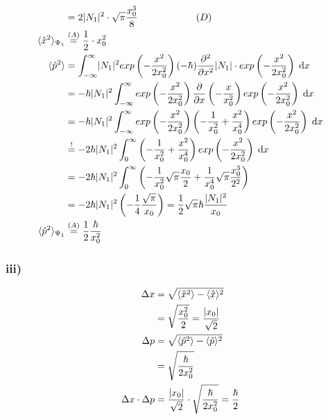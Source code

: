 \begin{align*}
        &= 2 \lvert N_1\rvert^2 \cdot \sqrt{\pi} \frac{x_0^3}{8} \qquad \qquad \qquad (D)\\
        \langle \hat{x}^2 \rangle_{\Psi_1} &\stackrel{(A)}{=} \frac{1}{2} \cdot x_0^2\\
        \langle \hat{p}^2 \rangle &= \int_{-\infty}^{\infty} \lvert N_1\rvert^2 exp \left(- \frac{x^2}{2x_0^2} \right) (-\hbar) \frac{\partial ^2}{\partial x^2} 
        \lvert N_1\rvert \cdot exp \left(- \frac{x^2}{2x_0^2} \right) \; \mathrm{d}x\\
        &= - \hbar \lvert N_1\rvert^2 \int_{-\infty}^{\infty} exp \left(- \frac{x^2}{2x_0^2} \right) \frac{\partial}{\partial x} \left( -\frac{x}{x_0^2} 
        \right) exp \left(- \frac{x^2}{2x_0^2} \right) \; \mathrm{d}x \nonumber\\
        &= - \hbar \lvert N_1\rvert^2 \int_{-\infty}^{\infty} exp \left(- \frac{x^2}{2x_0^2} \right) \left( -\frac{1}{x_0^2} + \frac{x^2}{x_0^4} \right) 
        exp \left(- \frac{x^2}{2x_0^2} \right) \; \mathrm{d}x \nonumber\\
        &\stackrel{!}{=} -2 \hbar \lvert N_1\rvert^2 \int_{0}^{\infty} \left( -\frac{1}{x_0^2} + \frac{x^2}{x_0^4} \right) exp \left(- \frac{x^2}{2x_0^2}
        \right) \; \mathrm{d}x \nonumber\\
        &= -2 \hbar \lvert N_1\rvert^2 \int_{0}^{\infty} \left( -\frac{1}{x_0^2} \sqrt{\pi} \frac{x_0}{2} + \frac{1}{x_0^4} \sqrt{\pi} \frac{x_0^3}{2^2}
        \right) \nonumber\\
        &= -2 \hbar \lvert N_1\rvert^2 \left( -\frac{1}{4} \frac{\sqrt{\pi}}{x_0} \right) = \frac{1}{2} \sqrt{\pi} \hbar \frac{\lvert N_1\rvert^2}{x_0} \nonumber\\
        \langle \hat{p}^2 \rangle_{\Psi_1} &\stackrel{(A)}{=} \frac{1}{2} \frac{\hbar}{x_0^2}
    \end{align*}

\subsubsection{iii)}

    \begin{align*}
        \Delta x &= \sqrt{\langle \hat{x}^2 \rangle - \langle \hat{x} \rangle^2}\\
        &= \sqrt{\frac{x_0^2}{2}} = \frac{\lvert x_0\rvert}{\sqrt{2}}\\
        \Delta p &= \sqrt{\langle \hat{p}^2 \rangle - \langle \hat{p} \rangle^2}\\
        &= \sqrt{\frac{\hbar}{2 x_0^2}}\\
        \Delta x \cdot \Delta p &= \frac{\lvert x_0\rvert}{\sqrt{2}} \cdot \sqrt{\frac{\hbar}{2 x_0^2}}
        = \frac{\hbar}{2}
    \end{align*}

